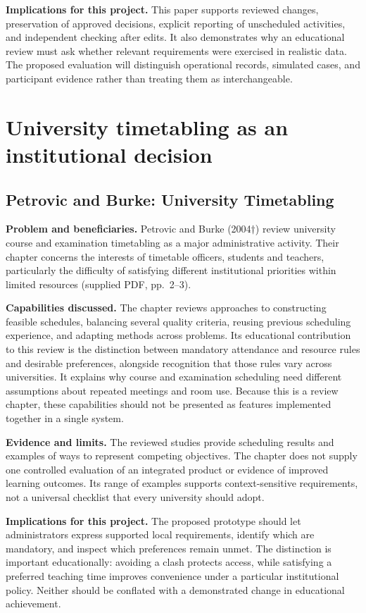 \documentclass[
  11pt,a4paper,oneside]{report}
\begin{document}
\textbf{Implications for this project.} This paper supports reviewed changes, preservation of approved decisions, explicit reporting of unscheduled activities, and independent checking after edits. It also demonstrates why an educational review must ask whether relevant requirements were exercised in realistic data. The proposed evaluation will distinguish operational records, simulated cases, and participant evidence rather than treating them as interchangeable.

\section{University timetabling as an institutional decision}
\subsection{Petrovic and Burke: University Timetabling}
\textbf{Problem and beneficiaries.} Petrovic and Burke (2004$\dagger$) review university course and examination timetabling as a major administrative activity. Their chapter concerns the interests of timetable officers, students and teachers, particularly the difficulty of satisfying different institutional priorities within limited resources (supplied PDF, pp.~2--3).

\textbf{Capabilities discussed.} The chapter reviews approaches to constructing feasible schedules, balancing several quality criteria, reusing previous scheduling experience, and adapting methods across problems. Its educational contribution to this review is the distinction between mandatory attendance and resource rules and desirable preferences, alongside recognition that those rules vary across universities. It explains why course and examination scheduling need different assumptions about repeated meetings and room use. Because this is a review chapter, these capabilities should not be presented as features implemented together in a single system.

\textbf{Evidence and limits.} The reviewed studies provide scheduling results and examples of ways to represent competing objectives. The chapter does not supply one controlled evaluation of an integrated product or evidence of improved learning outcomes. Its range of examples supports context-sensitive requirements, not a universal checklist that every university should adopt.

\textbf{Implications for this project.} The proposed prototype should let administrators express supported local requirements, identify which are mandatory, and inspect which preferences remain unmet. The distinction is important educationally: avoiding a clash protects access, while satisfying a preferred teaching time improves convenience under a particular institutional policy. Neither should be conflated with a demonstrated change in educational achievement.
\end{document}
